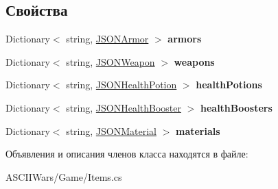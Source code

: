 \subsection*{Свойства}
\begin{DoxyCompactItemize}
\item 
\hypertarget{class_a_s_c_i_i_wars_1_1_game_1_1_item_container_ac7163583c5b161a5621b1d8c8eecb628}{}\label{class_a_s_c_i_i_wars_1_1_game_1_1_item_container_ac7163583c5b161a5621b1d8c8eecb628} 
Dictionary$<$ string, \hyperlink{class_a_s_c_i_i_wars_1_1_game_1_1_j_s_o_n_armor}{J\+S\+O\+N\+Armor} $>$ {\bfseries armors}
\item 
\hypertarget{class_a_s_c_i_i_wars_1_1_game_1_1_item_container_aaa8cd3f87c9f17712bca4ea090166ce7}{}\label{class_a_s_c_i_i_wars_1_1_game_1_1_item_container_aaa8cd3f87c9f17712bca4ea090166ce7} 
Dictionary$<$ string, \hyperlink{class_a_s_c_i_i_wars_1_1_game_1_1_j_s_o_n_weapon}{J\+S\+O\+N\+Weapon} $>$ {\bfseries weapons}
\item 
\hypertarget{class_a_s_c_i_i_wars_1_1_game_1_1_item_container_a84c795ebe8785d1d14dad75b7670f68a}{}\label{class_a_s_c_i_i_wars_1_1_game_1_1_item_container_a84c795ebe8785d1d14dad75b7670f68a} 
Dictionary$<$ string, \hyperlink{class_a_s_c_i_i_wars_1_1_game_1_1_j_s_o_n_health_potion}{J\+S\+O\+N\+Health\+Potion} $>$ {\bfseries health\+Potions}
\item 
\hypertarget{class_a_s_c_i_i_wars_1_1_game_1_1_item_container_aaecb48567ec96981ee40734e45f3339b}{}\label{class_a_s_c_i_i_wars_1_1_game_1_1_item_container_aaecb48567ec96981ee40734e45f3339b} 
Dictionary$<$ string, \hyperlink{class_a_s_c_i_i_wars_1_1_game_1_1_j_s_o_n_health_booster}{J\+S\+O\+N\+Health\+Booster} $>$ {\bfseries health\+Boosters}
\item 
\hypertarget{class_a_s_c_i_i_wars_1_1_game_1_1_item_container_a503bd6d21fce823b843969ccf07871bd}{}\label{class_a_s_c_i_i_wars_1_1_game_1_1_item_container_a503bd6d21fce823b843969ccf07871bd} 
Dictionary$<$ string, \hyperlink{class_a_s_c_i_i_wars_1_1_game_1_1_j_s_o_n_material}{J\+S\+O\+N\+Material} $>$ {\bfseries materials}
\end{DoxyCompactItemize}


Объявления и описания членов класса находятся в файле\+:\begin{DoxyCompactItemize}
\item 
A\+S\+C\+I\+I\+Wars/\+Game/Items.\+cs\end{DoxyCompactItemize}
